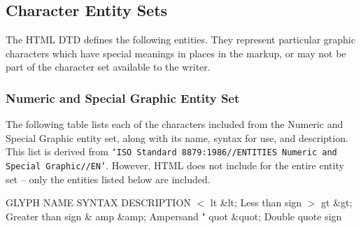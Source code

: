 \subsection*{Character Entity Sets}\par 
The HTML DTD defines the following entities.  They represent
particular graphic characters which have special meanings in places in
the markup, or may not be part of the character set available to the
writer.
\par \subsubsection*{Numeric and Special Graphic Entity Set}\par 
The following table lists each of the characters included from the
Numeric and Special Graphic entity set, along with its name, syntax
for use, and description.  This list is derived from {\tt `ISO Standard 8879:1986//ENTITIES Numeric and Special Graphic//EN'}.  However,
HTML does not include for the entire entity set -- only the entities
listed below are included.
\par GLYPH   NAME      SYNTAX       DESCRIPTION
$<$       lt      \&lt;    Less than sign
$>$       gt      \&gt;    Greater than sign
\&       amp     \&amp;   Ampersand
"       quot    \&quot;  Double quote sign
